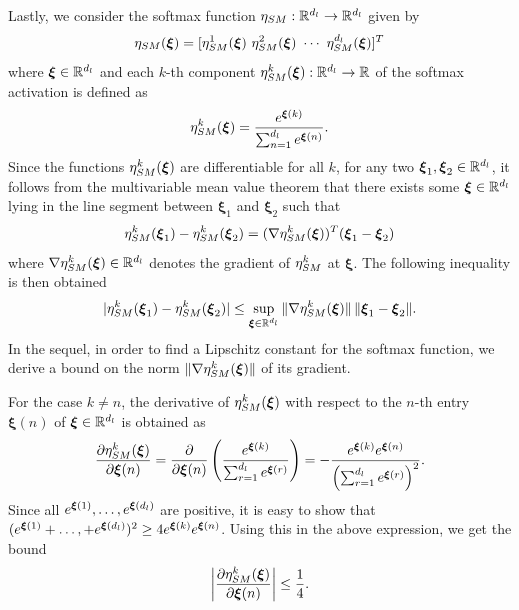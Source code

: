 \documentclass[review,supplement,onefignum,onetabnum]{siamonline250211}
\begin{document}
Lastly, we consider the softmax function  $\eta_{SM}: \mathbb{R}^{d_l} \rightarrow \mathbb{R}^{d_l}$ given by 
%
\[
\act_{SM}(\boldsymbol{\xi}) = [\act_{SM}^1(\boldsymbol{\xi}) \ \act_{SM}^2(\boldsymbol{\xi}) \ \cdots  \ \act_{SM}^{\dl}(\boldsymbol{\xi}) ]^T
\]
%
where $\boldsymbol{\xi} \in \mathbb{R}^{d_l}$ and each $k$-th component $\eta_{SM}^k(\boldsymbol{\xi}): \mathbb{R}^{d_l} \rightarrow \mathbb{R}$ of the softmax activation is defined as
%
\begin{equation}
\begin{split}
\eta_{SM}^k(\boldsymbol{\xi}) = \frac{e^{\boldsymbol{\xi}(k)}}{ \sum_{n=1}^{{d_l}} e^{\boldsymbol{\xi}(n)}}.
\end{split}
\end{equation}
%
Since the functions $\eta_{SM}^k(\boldsymbol{\xi})$ are differentiable for all $k$, for any two $\boldsymbol{\xi}_1, \boldsymbol{\xi}_2 \in \mathbb{R}^{d_l}$, it follows from the multivariable mean value theorem that there exists some $\boldsymbol{\xi} \in \mathbb{R}^{d_l}$ lying in the line segment between $\boldsymbol{\xi}_1$ and $\boldsymbol{\xi}_2$ such that
%
\[
\eta_{SM}^k(\boldsymbol{\xi}_1) - \eta_{SM}^k(\boldsymbol{\xi}_2) = (\nabla \eta_{SM}^k(\boldsymbol{\xi}))^T (\boldsymbol{\xi}_1 - \boldsymbol{\xi}_2)
\]
where $\nabla \eta_{SM}^k (\boldsymbol{\xi}) \in \mathbb{R}^{d_l}$ denotes the gradient of $\eta_{SM}^k$ at $\boldsymbol{\xi}$. The following inequality is then obtained
%
\begin{equation}
\label{eq_bnd_grad_sm}
| \eta_{SM}^k(\boldsymbol{\xi}_1) - \eta_{SM}^k(\boldsymbol{\xi}_2) | \leq 
\sup_{\boldsymbol{\xi} \in \mathbb{R}^{d_l}} \| \nabla \eta_{SM}^k (\boldsymbol{\xi})   \|  \, \| \boldsymbol{\xi}_1 - \boldsymbol{\xi}_2 \|.
\end{equation}
%
In the sequel, in order to find a Lipschitz constant for the softmax function, we derive a bound on the norm $\| \nabla \eta_{SM}^k (\boldsymbol{\xi})   \| $ of its gradient. 

For the case $k\neq n$, the derivative of $\eta_{SM}^k (\boldsymbol{\xi})  $ with respect to the $n$-th entry $\boldsymbol{\xi} (n)$ of $\boldsymbol{\xi} \in \mathbb{R}^{d_l}$ is obtained as
%
\begin{equation*}
\begin{split}
\frac{\partial \eta_{SM}^k (\boldsymbol{\xi})  }{\partial \boldsymbol{\xi}(n)} 
=  \frac{\partial }{\partial \boldsymbol{\xi}(n)} 
\left( \frac{e^{\boldsymbol{\xi}(k)}}{ \sum_{r=1}^{{d_l}} e^{\boldsymbol{\xi}(r)}} \right)
= -  \frac{e^{\boldsymbol{\xi}(k)} e^{\boldsymbol{\xi}(n)} }{\left( \sum_{r=1}^{{d_l}} e^{\boldsymbol{\xi}(r)} \right)^2}.
\end{split}
\end{equation*}
%
Since all $e^{\boldsymbol{\xi}(1)}, \dots , e^{\boldsymbol{\xi}({d_l})}$ are positive, it is easy to show that $(e^{\boldsymbol{\xi}(1)} + \dots , +e^{\boldsymbol{\xi}({d_l})})^2 \geq 4 e^{\boldsymbol{\xi}(k)} e^{\boldsymbol{\xi}(n)}$. Using this in the above expression, we get the bound
%
\begin{equation}
\label{eq_lip_sm_kneqn}
\begin{split}
\left | \frac{\partial \eta_{SM}^k (\boldsymbol{\xi})  }{\partial \boldsymbol{\xi}(n)} \right |
\leq \frac{1}{4}.
\end{split}
\end{equation}
\end{document}
